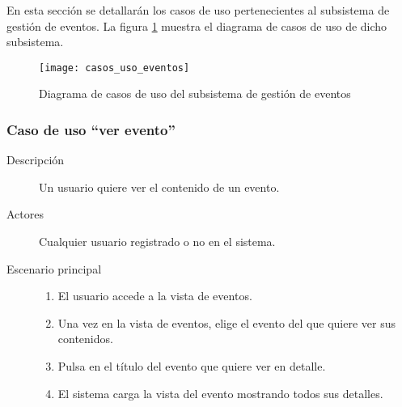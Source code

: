 En esta sección se detallarán los casos de uso pertenecientes al subsistema de gestión de eventos. La figura \ref{fig:casos_uso_subsistema_eventos} muestra el diagrama de casos de uso de dicho subsistema.

\begin{figure}[h]
\centering
\texttt{[image: casos\_uso\_eventos]}
\caption{Diagrama de casos de uso del subsistema de gestión de eventos}
\label{fig:casos_uso_subsistema_eventos}
\end{figure}


\subsubsection{Caso de uso ``ver evento''}
\begin{description}
\item[Descripción] Un usuario quiere ver el contenido de un evento.
\item[Actores] Cualquier usuario registrado o no en el sistema.
\item[Escenario principal] 	\hfill
							\begin{enumerate}
							\item El usuario accede a la vista de eventos.
							\item Una vez en la vista de eventos, elige el evento del que quiere ver sus contenidos.
							\item Pulsa en el título del evento que quiere ver en detalle.
							\item El sistema carga la vista del evento mostrando todos sus detalles.
							\end{enumerate}
\end{description}


